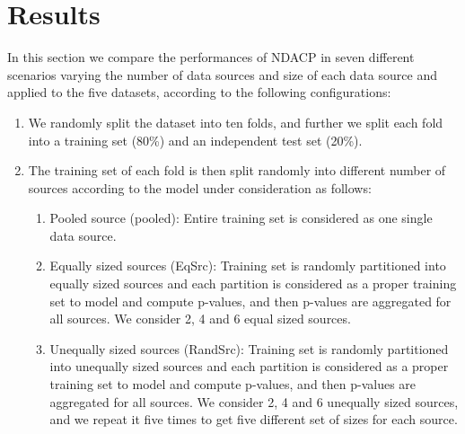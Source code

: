 \documentclass[main]{subfiles}
\newcommand{\todo}[1]{{\color{blue} #1 }}
\begin{document}
\section{Results}\label{sec:results}
In this section we compare the performances of NDACP in seven different scenarios varying the number of data sources and size of each data source and applied to the five datasets, according to the following configurations: %
%
\begin{enumerate}

\item We randomly split the dataset into ten folds, and further we split each fold into a training set (80\%) and an independent test set (20\%). %

\item The training set of each fold is then split randomly into different number of sources according to the model under consideration as follows:
\begin{enumerate}
	\item Pooled source (pooled): Entire training set is considered as one single data source.
	\item Equally sized sources (EqSrc): Training set is randomly partitioned into equally sized sources and  each partition is considered as a proper training set to model and compute p-values, and then p-values are aggregated for all sources. We consider 2, 4 and 6 equal sized sources. %
	\item Unequally sized sources (RandSrc): Training set is randomly partitioned into unequally sized sources and  each partition is considered as a proper training set to model and compute p-values, and then p-values are aggregated for all sources. We consider 2, 4 and 6 unequally sized sources, and we repeat it five times to get five different set of sizes for each source.

\end{enumerate}

\end{enumerate}
\end{document}
